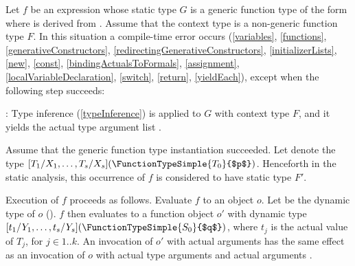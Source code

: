 \documentclass[makeidx]{article}
\begin{document}
{

\LMHash{}%
Let $f$ be an expression whose static type $G$ is
%
a generic function type of the form
where  is derived from .
Assume that the context type is a non-generic function type $F$.
In this situation a compile-time error occurs
(\ref{variables},
\ref{functions},
\ref{generativeConstructors},
\ref{redirectingGenerativeConstructors},
\ref{initializerLists},
\ref{new},
\ref{const},
\ref{bindingActualsToFormals},
\ref{assignment},
\ref{localVariableDeclaration},
\ref{switch},
\ref{return},
\ref{yieldEach}),
except when the following step succeeds:

\LMHash{}%
:
Type inference
(\ref{typeInference})
is applied to $G$ with context type $F$,
and it yields the actual type argument list
%
.


\LMHash{}%
Assume that the generic function type instantiation succeeded.
Let  denote the type
$[T_1/X_1, \ldots, T_s/X_s](\FunctionTypeSimple{T_0}{$p$})$.
Henceforth in the static analysis,
this occurrence of $f$ is considered to have static type $F'$.

\LMHash{}%
Execution of $f$ proceeds as follows.
Evaluate $f$ to an object $o$.
Let  be the dynamic type of $o$
().
$f$ then evaluates to a function object $o'$ with dynamic type
$[t_1/Y_1, \ldots, t_s/Y_s](\FunctionTypeSimple{S_0}{$q$})$,
where $t_j$ is the actual value of $T_j$, for $j \in 1 .. k$.
An invocation of $o'$ with actual arguments  has
the same effect as an invocation of $o$
with actual type arguments  and actual arguments .

}
\end{document}
